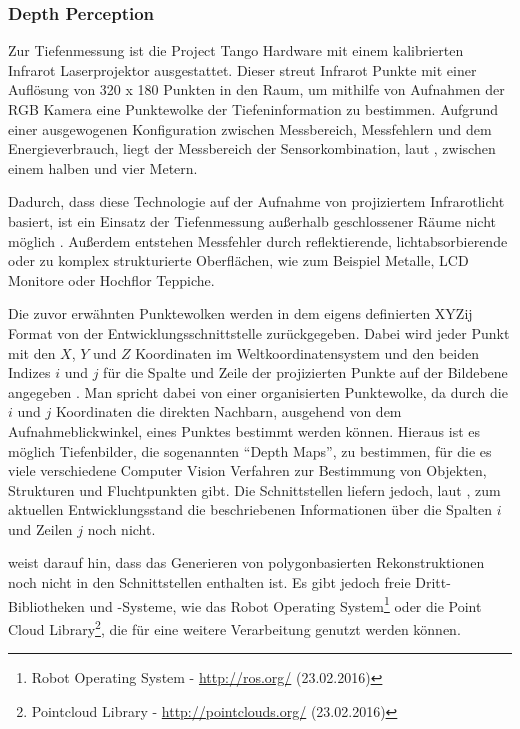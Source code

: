 \subsubsection{Depth Perception}

Zur Tiefenmessung ist die Project Tango Hardware mit einem kalibrierten Infrarot Laserprojektor ausgestattet. Dieser streut Infrarot Punkte mit einer Auflösung von 320 x 180 Punkten in den Raum, um mithilfe von Aufnahmen der RGB Kamera eine Punktewolke der Tiefeninformation zu bestimmen. Aufgrund einer ausgewogenen Konfiguration zwischen Messbereich, Messfehlern und dem Energieverbrauch, liegt der Messbereich der Sensorkombination, laut \citet{GoogleDevelopersConcepts:online}, zwischen einem halben und vier Metern. 

Dadurch, dass diese Technologie auf der Aufnahme von projiziertem Infrarotlicht basiert, ist ein Einsatz der Tiefenmessung außerhalb geschlossener Räume nicht möglich \citep{GoogleDevelopersConcepts:online}. Außerdem entstehen Messfehler durch reflektierende, lichtabsorbierende oder zu komplex strukturierte Oberflächen, wie zum Beispiel Metalle, LCD Monitore oder Hochflor Teppiche. 

Die zuvor erwähnten Punktewolken werden in dem eigens definierten XYZij Format von der Entwicklungsschnittstelle zurückgegeben. Dabei wird jeder Punkt mit den \(X\), \(Y\) und \(Z\) Koordinaten im Weltkoordinatensystem und den beiden Indizes \(i \) und \(j \) für die Spalte und Zeile der projizierten Punkte auf der Bildebene angegeben \citep{GoogleDevelopersConcepts:online}. Man spricht dabei von einer organisierten Punktewolke, da durch die \(i\) und \(j\) Koordinaten die direkten Nachbarn, ausgehend von dem Aufnahmeblickwinkel, eines Punktes bestimmt werden können. Hieraus ist es möglich Tiefenbilder, die sogenannten \enquote{Depth Maps}, zu bestimmen, für die es viele verschiedene Computer Vision Verfahren zur Bestimmung von Objekten, Strukturen und Fluchtpunkten gibt. Die Schnittstellen liefern jedoch, laut \citet{GoogleDevelopersKnownIssues:online}, zum aktuellen Entwicklungsstand die beschriebenen Informationen über die Spalten \(i\) und Zeilen \(j\) noch nicht.

\citet{GoogleDevelopersConcepts:online} weist darauf hin, dass das Generieren von polygonbasierten Rekonstruktionen noch nicht in den Schnittstellen enthalten ist. Es gibt jedoch freie Dritt-Bibliotheken und -Systeme, wie das Robot Operating System\footnote{Robot Operating System - \url{http://ros.org/} (23.02.2016)} oder die Point Cloud Library\footnote{Pointcloud Library - \url{http://pointclouds.org/} (23.02.2016)}, die für eine weitere Verarbeitung genutzt werden können.

